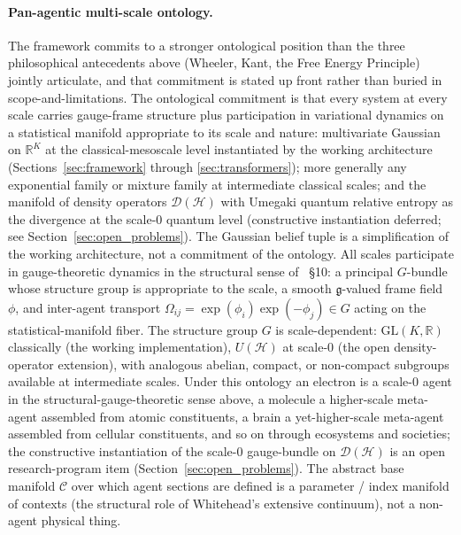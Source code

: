 \documentclass[11pt]{article}
\begin{document}
\paragraph{Pan-agentic multi-scale ontology.} The framework commits to a stronger ontological position than the three philosophical antecedents above (Wheeler, Kant, the Free Energy Principle) jointly articulate, and that commitment is stated up front rather than buried in scope-and-limitations. The ontological commitment is that every system at every scale carries gauge-frame structure plus participation in variational dynamics on a statistical manifold appropriate to its scale and nature: multivariate Gaussian on $\mathbb{R}^K$ at the classical-mesoscale level instantiated by the working architecture (Sections~\ref{sec:framework} through \ref{sec:transformers}); more generally any exponential family or mixture family at intermediate classical scales; and the manifold of density operators $\mathcal{D}(\mathcal{H})$ with Umegaki quantum relative entropy as the divergence at the scale-0 quantum level (constructive instantiation deferred; see Section~\ref{sec:open_problems}). The Gaussian belief tuple is a simplification of the working architecture, not a commitment of the ontology. All scales participate in gauge-theoretic dynamics in the structural sense of~\cite{Nakahara2003} \S 10: a principal $G$-bundle whose structure group is appropriate to the scale, a smooth $\mathfrak{g}$-valued frame field $\phi$, and inter-agent transport $\Omega_{ij} = \exp(\phi_i)\exp(-\phi_j) \in G$ acting on the statistical-manifold fiber. The structure group $G$ is scale-dependent: $\mathrm{GL}(K,\mathbb{R})$ classically (the working implementation), $U(\mathcal{H})$ at scale-0 (the open density-operator extension), with analogous abelian, compact, or non-compact subgroups available at intermediate scales. Under this ontology an electron is a scale-0 agent in the structural-gauge-theoretic sense above, a molecule a higher-scale meta-agent assembled from atomic constituents, a brain a yet-higher-scale meta-agent assembled from cellular constituents, and so on through ecosystems and societies; the constructive instantiation of the scale-0 gauge-bundle on $\mathcal{D}(\mathcal{H})$ is an open research-program item (Section~\ref{sec:open_problems}). The abstract base manifold $\mathcal{C}$ over which agent sections are defined is a parameter / index manifold of contexts (the structural role of Whitehead's extensive continuum), not a non-agent physical thing.
\end{document}
